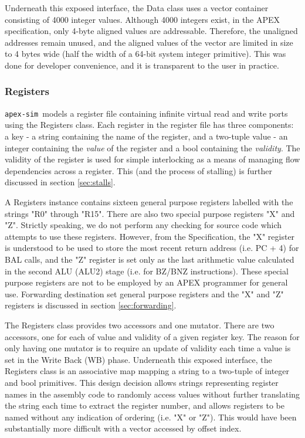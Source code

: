 \documentclass[12pt]{article}
\newcommand{\codename}[0]{\texttt{apex-sim}~}
\begin{document}
Underneath this exposed interface, the Data class uses a vector container consisting of 4000 integer values. 
Although 4000 integers exist, in the APEX specification, only 4-byte aligned values are addressable. 
Therefore, the unaligned addresses remain unused, and the aligned values of the vector are limited in size to 4 bytes wide (half the width of a 64-bit system integer primitive). This was done for developer convenience, and it is transparent to the user in practice.

\subsubsection{Registers}
\codename models a register file containing infinite virtual read and write ports using the Registers class.
Each register in the register file has three components: a key \-- a string containing the name of the register, and a two-tuple value \-- an integer containing the \textit{value} of the register and a bool containing the \textit{validity}. 
The validity of the register is used for simple interlocking as a means of managing flow dependencies across a register.
This (and the process of stalling) is further discussed in section \ref{sec:stalls}.

A Registers instance contains sixteen general purpose registers labelled with the strings "R0" through "R15". 
There are also two special purpose registers "X" and "Z".
Strictly speaking, we do not perform any checking for source code which attempts to use these registers.
However, from the Specification, the "X" register is understood to be used to store the most recent return address (i.e. PC + 4) for BAL calls, and the "Z" register is set only as the last arithmetic value calculated in the second ALU (ALU2) stage (i.e. for BZ/BNZ instructions).
These special purpose registers are not to be employed by an APEX programmer for general use.
Forwarding destination set general purpose registers and the "X" and "Z" registers is discussed in section \ref{sec:forwarding}.

The Registers class provides two accessors and one mutator. There are two accessors, one for each of value and validity of a given register key. 
The reason for only having one mutator is to require an update of validity each time a value is set in the Write Back (WB) phase.
Underneath this exposed interface, the Registers class is an associative map mapping a string to a two-tuple of integer and bool primitives. 
This design decision allows strings representing register names in the assembly code to randomly access values without further translating the string each time to extract the register number, and allows registers to be named without any indication of ordering (i.e. "X" or "Z"). 
This would have been substantially more difficult with a vector accessed by offset index.
\end{document}

